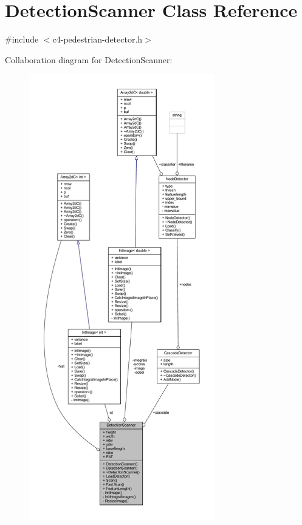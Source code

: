 \hypertarget{class_detection_scanner}{}\section{Detection\+Scanner Class Reference}
\label{class_detection_scanner}


{\ttfamily \#include $<$c4-\/pedestrian-\/detector.\+h$>$}



Collaboration diagram for Detection\+Scanner\+:\nopagebreak
\begin{figure}[H]
\begin{center}
\leavevmode
\includegraphics[height=550pt]{class_detection_scanner__coll__graph}
\end{center}
\end{figure}
